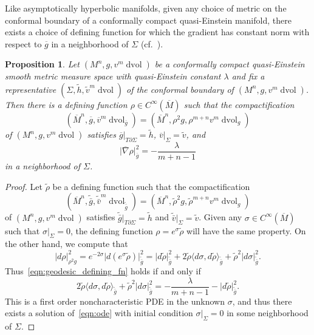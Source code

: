 \documentclass{amsart}
\newtheorem{prop}[thm]{Proposition}
\theoremstyle{definition}
\theoremstyle{remark}
\numberwithin{equation}{section}
\begin{document}
Like asymptotically hyperbolic manifolds, given any choice of metric on the conformal boundary of a conformally compact quasi-Einstein manifold, there exists a choice of defining function for which the gradient has constant norm with respect to ${\overline{g}}$ in a neighborhood of $\Sigma$ (cf.\ \cite{Lee1995}).

\begin{prop}
\label{prop:geodesic_defining_function}
Let $(M^n,g,v^m\operatorname{dvol})$ be a conformally compact quasi-Einstein smooth metric measure space with quasi-Einstein constant $\lambda$ and fix a representative $(\Sigma,\tilde h,\tilde v^m\operatorname{dvol})$ of the conformal boundary of $(M^n,g,v^m\operatorname{dvol})$.  Then there is a defining function $\rho\in C^\infty(\overline{M})$ such that the compactification
\begin{equation}
\label{eqn:conformal_compactification_formula}
\left( \overline{M}^n, {\overline{g}}, {\overline{v}}^m\operatorname{dvol}_{\overline{g}} \right) = \left( \overline{M}^n, \rho^2g, \rho^{m+n}v^m\operatorname{dvol}_g \right)
\end{equation}
of $(M^n,g,v^m\operatorname{dvol})$ satisfies ${\overline{g}}{\rvert}_{T\partial\Sigma}=\tilde h$, ${\overline{v}}{\rvert}_\Sigma=\tilde v$, and
\begin{equation}
\label{eqn:geodesic_defining_fn}
{\lvert}{\overline{\nabla}}\rho{\rvert}_{\overline{g}}^2 = -\frac{\lambda}{m+n-1}
\end{equation}
in a neighborhood of $\Sigma$.
\end{prop}

\begin{proof}

Let $\tilde\rho$ be a defining function such that the compactification
\[ \left( \overline{M}^n, \tilde{\bar g}, \tilde{\bar v}^m\operatorname{dvol}_{\tilde\bar g} \right) = \left( \overline{M}^n, \tilde\rho^2g, \tilde\rho^{m+n}v^m\operatorname{dvol}_g \right) \]
of $(M^n,g,v^m\operatorname{dvol})$ satisfies $\tilde{\bar g}{\rvert}_{T\partial\Sigma}=\tilde h$ and $\tilde{\bar v}{\rvert}_\Sigma=\tilde v$.  Given any $\sigma\in C^\infty(\overline{M})$ such that $\sigma{\rvert}_\Sigma=0$, the defining function $\rho=e^\sigma\tilde\rho$ will have the same property.  On the other hand, we compute that
\[ {\lvert} d\rho{\rvert}_{\rho^2g}^2 = e^{-2\sigma}{\lvert} d(e^\sigma\tilde\rho){\rvert}_{\tilde{\bar g}}^2 = {\lvert} d\tilde\rho{\rvert}_{\tilde{\bar g}}^2 + 2\tilde\rho{\langle} d\sigma, d\tilde\rho{\rangle}_{\tilde{\bar g}} + \tilde\rho^2{\lvert} d\sigma{\rvert}_{\tilde{\bar g}}^2 . \]
Thus~\eqref{eqn:geodesic_defining_fn} holds if and only if
\begin{equation}
\label{eqn:ode}
2\tilde\rho{\langle} d\sigma, d\tilde\rho{\rangle}_{\tilde{\bar g}} + \tilde\rho^2{\lvert} d\sigma{\rvert}_{\tilde{\bar g}}^2 = -\frac{\lambda}{m+n-1} - {\lvert} d\tilde\rho{\rvert}_{\tilde{\bar g}}^2 .
\end{equation}
This is a first order noncharacteristic PDE in the unknown $\sigma$, and thus there exists a solution of~\eqref{eqn:ode} with initial condition $\sigma{\rvert}_\Sigma=0$ in some neighborhood of $\Sigma$.
\end{proof}
\end{document}
